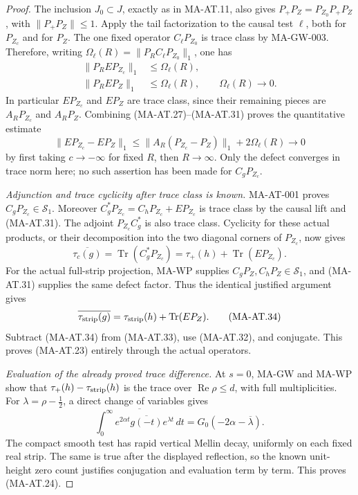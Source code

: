 \begin{proof}
The inclusion \(J_0\subset J\), exactly as in MA-AT.11, also gives
\(P_+P_Z=P_{Z_0}P_+P_Z\), with \(\|P_+P_Z\|\le1\).
Apply the tail factorization to the causal test \(\ell\), both
for \(P_{Z_c}\) and for \(P_Z\).
The one fixed operator \(C_\ell P_{Z_0}\) is trace class by
MA-GW-003.  Therefore, writing
\(\Omega_\ell(R)=\|P_RC_\ell P_{Z_0}\|_1\), one has
\[
 \begin{aligned}
 \|P_REP_{Z_c}\|_1&\le\Omega_\ell(R),\\
 \|P_REP_Z\|_1&\le\Omega_\ell(R),\qquad
                  \Omega_\ell(R)\longrightarrow0.
 \end{aligned}
 \tag{MA-AT.31}
\]
In particular \(EP_{Z_c}\) and \(EP_Z\) are trace class, since
their remaining pieces are \(A_RP_{Z_c}\) and \(A_RP_Z\).
Combining (MA-AT.27)--(MA-AT.31) proves the quantitative estimate
\[
 \|EP_{Z_c}-EP_Z\|_1
   \le\|A_R(P_{Z_c}-P_Z)\|_1+2\Omega_\ell(R)
       \longrightarrow0
 \tag{MA-AT.32}
\]
by first taking \(c\to-\infty\) for fixed \(R\), then
\(R\to\infty\).
Only the defect converges in trace norm here; no such assertion
has been made for \(C_gP_{Z_c}\).

\emph{Adjunction and trace cyclicity after trace class is known.}
MA-AT-001 proves \(C_gP_{Z_c}\in\mathcal S_1\).
Moreover
\(C_g^*P_{Z_c}=C_hP_{Z_c}+EP_{Z_c}\) is trace class by the
causal lift and (MA-AT.31).
The adjoint \(P_{Z_c}C_g^*\) is also trace class.
Cyclicity for these actual products, or their decomposition
into the two diagonal corners of \(P_{Z_c}\), now gives
\[
 \overline{\tau_c(g)}
       =\operatorname{Tr}(C_g^*P_{Z_c})
       =\tau_+(h)+\operatorname{Tr}(EP_{Z_c}).
 \tag{MA-AT.33}
\]
For the actual full-strip projection, MA-WP supplies
\(C_gP_Z,C_hP_Z\in\mathcal S_1\), and (MA-AT.31) supplies
the same defect factor.  Thus the identical justified argument gives
\[
 \overline{\tau_{\rm strip}(g)}
       =\tau_{\rm strip}(h)+\operatorname{Tr}(EP_Z).
 \tag{MA-AT.34}
\]
Subtract (MA-AT.34) from (MA-AT.33), use (MA-AT.32), and
conjugate.  This proves (MA-AT.23) entirely through the actual
operators.

\emph{Evaluation of the already proved trace difference.}
At \(s=0\), MA-GW and MA-WP show that
\(\tau_+(h)-\tau_{\rm strip}(h)\) is the trace over
\(\operatorname{Re}\rho\le d\), with full multiplicities.
For \(\lambda=\rho-\tfrac12\), a direct change of variables gives
\[
 \overline{\int_0^\infty
       e^{2\alpha t}\overline{g(-t)}e^{\lambda t}\,dt}
      =G_0(-2\alpha-\overline{\lambda}).
 \tag{MA-AT.35}
\]
The compact smooth test has rapid vertical Mellin decay,
uniformly on each fixed real strip.  The same is true after
the displayed reflection, so the known unit-height zero count
justifies conjugation and evaluation term by term.
This proves (MA-AT.24).
\end{proof}

